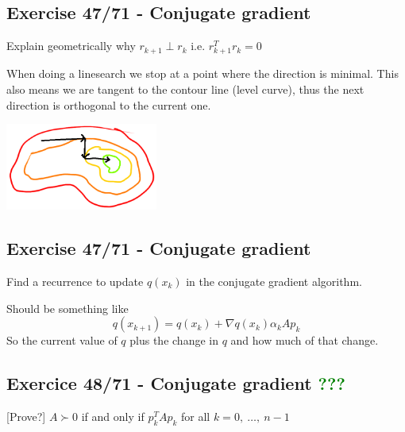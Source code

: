\subsection{Exercise 47/71 - Conjugate gradient}

Explain geometrically why $r_{k+1} \perp r_k$ i.e. $r_{k+1}^T r_k = 0$

\answer

When doing a linesearch we stop at a point where the direction is minimal. This also means we are tangent to the contour line (level curve), thus the next direction is orthogonal to the current one.

\begin{center}
	\includegraphics[width=5cm]{fig/unconstrained/47_71.png}
\end{center}


\subsection{Exercise 47/71 - Conjugate gradient}

Find a recurrence to update $q(x_k)$ in the conjugate gradient algorithm.

\answer

Should be something like 
\[
	q(x_{k+1}) = q(x_k) + \nabla q(x_k) \alpha_k A p_k
\]
So the current value of $q$ plus the change in $q$ and how much of that change.

\incomplete

\subsection{Exercice 48/71 - Conjugate gradient \textcolor{green}{???}}
[Prove?] $A \succ 0$ if and only if $p_k^T A p_k$ for all $k = 0,\ \ldots,\ n-1$

\incomplete











